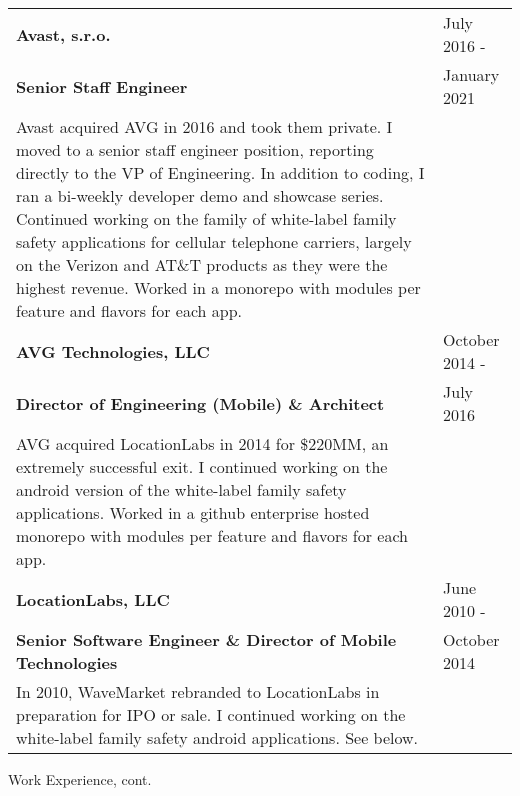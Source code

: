 \begin{tabular}{p{5.2in}@{\hspace{1.5cm}}l}

	\bf  Avast, s.r.o. 	    & July 2016 -  \\
	\bf  Senior Staff Engineer	& January 2021 \\[4pt]
	
	   Avast acquired AVG in 2016 and took them private.  I moved to a senior staff engineer position,
	   reporting directly to the VP of Engineering.  In addition to coding, I ran a bi-weekly developer demo
	   and showcase series.
	   Continued working on the family of white-label family safety applications for cellular
	   telephone carriers, largely on the Verizon and AT\&T products as they were the highest revenue. 
	   Worked in a monorepo with modules per feature and flavors for each app. \\[9pt]
	   
	\bf AVG Technologies, LLC 	& October 2014 -  \\
	\bf  Director of Engineering (Mobile)  \& Architect 	& July 2016 \\[4pt]
	
	   AVG acquired LocationLabs in 2014 for \$220MM, an extremely successful exit.   I 
	   continued working on the android version of the white-label family safety applications. 
	   Worked in a github enterprise hosted monorepo with modules per feature and flavors for each app.\\[9pt]
	   
	\bf LocationLabs, LLC   & June 2010 -  \\
	\bf   Senior Software Engineer \& Director of Mobile Technologies 	& October 2014 \\[4pt]
	
	   In 2010, WaveMarket rebranded to LocationLabs in preparation for IPO or sale.
	   I continued working on the white-label family safety android applications. See below. \\[9pt]
	   

\end{tabular}

\newpage
\begin{bf} \large
Work Experience, cont.
\end{bf}
\medskip


